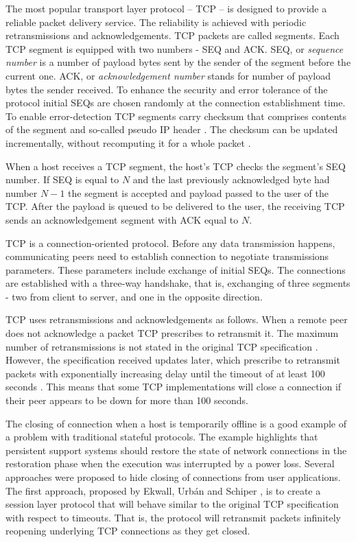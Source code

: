 The most popular transport layer protocol -- TCP -- is designed to provide a 
reliable packet delivery service. The reliability is achieved with periodic
retransmissions and acknowledgements. TCP packets are called segments. Each TCP
segment is equipped with two numbers - SEQ and ACK. SEQ, or \textit{sequence
number} is a number of payload bytes sent by the sender of the segment before
the current one. ACK, or \textit{acknowledgement number} stands for number of
payload bytes the sender received. To enhance the security and error tolerance
of the protocol initial SEQs are chosen randomly at the connection
establishment time. To enable error-detection TCP segments carry checksum that
comprises contents of the segment and so-called pseudo IP header
\cite{tcp_ip_illustrated_vol2}. The checksum can be updated incrementally,
without recomputing it for a whole packet \cite{rfc1624}.

When a host receives a TCP segment, the host's TCP checks the segment's SEQ
number. If SEQ is equal to $N$ and the last previously acknowledged byte had
number $N-1$ the segment is accepted and payload passed to the user of the TCP.
After the payload is queued to be delivered to the user, the receiving TCP
sends an acknowledgement segment with ACK equal to $N$.

TCP is a connection-oriented protocol. Before any data transmission happens,
communicating peers need to establish connection to negotiate transmissions
parameters. These parameters include exchange of initial SEQs. The connections
are established with a three-way handshake, that is, exchanging of three
segments - two from client to server, and one in the opposite direction.

TCP uses retransmissions and acknowledgements as follows. When a remote peer
does not acknowledge a packet TCP prescribes to retransmit it. The maximum
number of retransmissions is not stated in the original TCP specification
\cite{john1981transmission}.  However, the specification received updates
later, which prescribe to retransmit packets with exponentially increasing
delay \cite{rfc6298} until the timeout of at least 100 seconds \cite{rfc1122}.
This means that some TCP implementations will close a connection if their
peer appears to be down for more than 100 seconds.

The closing of connection when a host is temporarily offline is a good example
of a problem with traditional stateful protocols. The example highlights that
persistent support systems should restore the state of network connections in
the restoration phase when the execution was interrupted by a power loss.
Several approaches were proposed to hide closing of connections from user
applications.  The first approach, proposed by Ekwall, Urb{\'a}n and Schiper
\cite{ekwall2002robust}, is to create a session layer protocol that will behave
similar to the original TCP specification with respect to timeouts. That is,
the protocol will retransmit packets infinitely reopening underlying TCP
connections as they get closed.

